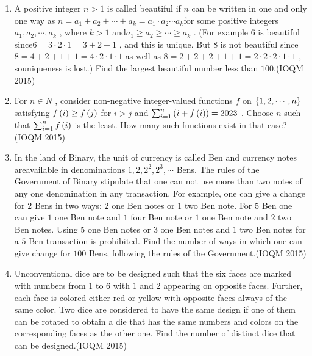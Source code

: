 \begin{enumerate}
	\item A positive integer $n > 1$ is called beautiful if $n$ can be written in one and only one way as $n = a_{1} + a_{2} + \cdots + a_{k} = a_{1} \cdot a_{2} \cdots a_{k} $for some positive integers $a_{1},a_{2}, \cdots , a_{k}$ , where $k > 1$ and$ a_{1}  \geq a_{2} \geq \cdots \geq a_{k}$ . (For example $6$ is beautiful since$ 6 = 3 \cdot 2 \cdot 1 = 3 + 2 + 1$ , and this is unique. But $8$ is not beautiful since $8 = 4 + 2 + 1 + 1 = 4 \cdot 2 \cdot 1 \cdot 1 $  as well as $8 = 2 + 2 + 2 + 1 + 1 = 2 \cdot 2 \cdot 2 \cdot 1 \cdot 1$ , souniqueness is lost.) Find the largest beautiful number less than $100$.\hfill(IOQM 2015)



	\item For $n \in N$ , consider non-negative integer-valued functions $f$ on $\left\{1, 2, \cdots , n\right\}$ satisfying $f\left(i\right) \geq f\left(j\right)$ for $i > j$ and $\sum_{i=1}^n \left(i + f\left(i\right)\right) = 2023$ . Choose $n$ such that $\sum_{i=1}^n f\left(i\right)$ is the least. How many such functions exist in that case?\hfill(IOQM 2015)



	\item In the land of Binary, the unit of currency is called Ben and currency notes areavailable in denominations $1, 2, 2^2, 2^3, \cdots $ Bens. The rules of the Government of Binary stipulate that one can not use more than two notes of any one denomination in any transaction. For example, one can give a change for $2$ Bens in two ways: $2$ one Ben notes or $1$ two Ben note. For $5$ Ben one can give $1$ one Ben note and $1$ four Ben note or $1$ one Ben note and $2$ two Ben notes. Using $5$ one Ben notes or $3$ one Ben notes and $1$ two Ben notes for a $5$ Ben transaction is prohibited. Find the number of ways in which one can give change for $100$ Bens, following the rules of the Government.\hfill(IOQM 2015)	
	\item Unconventional dice are to be designed such that the six faces are marked with numbers from $1$ to $6$ with $1$ and $2$ appearing on opposite faces. Further, each face is colored either red or yellow with opposite faces always of the same color. Two dice are considered to have the same design if one of them can be rotated to obtain a die that has the same numbers and colors on the corresponding faces as the other one. Find the number of distinct dice that can be designed.\hfill(IOQM 2015)
    

\end{enumerate}
